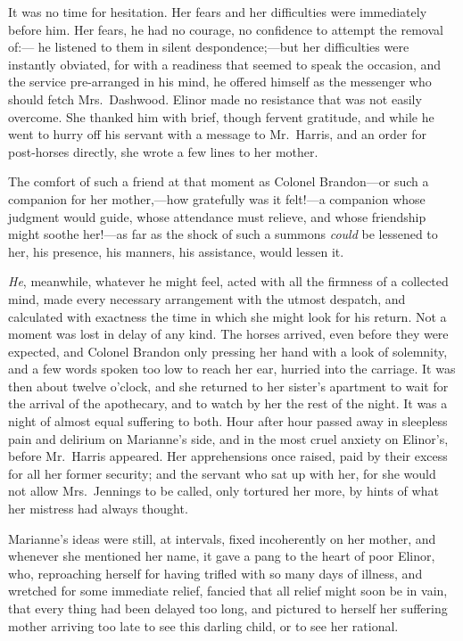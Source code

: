 \documentclass{article}
\begin{document}
It was no time for hesitation.  Her fears and her
difficulties were immediately before him.  Her fears,
he had no courage, no confidence to attempt the removal of:---%
he listened to them in silent despondence;---but her
difficulties were instantly obviated, for with a readiness
that seemed to speak the occasion, and the service
pre-arranged in his mind, he offered himself as the
messenger who should fetch Mrs.\ Dashwood.  Elinor made no
resistance that was not easily overcome.  She thanked him
with brief, though fervent gratitude, and while he went
to hurry off his servant with a message to Mr.\ Harris, and
an order for post-horses directly, she wrote a few lines
to her mother.

The comfort of such a friend at that moment as Colonel
Brandon---or such a companion for her mother,---how gratefully
was it felt!---a companion whose judgment would guide,
whose attendance must relieve, and whose friendship might
soothe her!---as far as the shock of such a summons \emph{could}
be lessened to her, his presence, his manners, his assistance,
would lessen it.

\emph{He}, meanwhile, whatever he might feel, acted with all
the firmness of a collected mind, made every necessary
arrangement with the utmost despatch, and calculated
with exactness the time in which she might look for
his return.  Not a moment was lost in delay of any kind.
The horses arrived, even before they were expected,
and Colonel Brandon only pressing her hand with a look
of solemnity, and a few words spoken too low to reach her ear,
hurried into the carriage.  It was then about twelve
o'clock, and she returned to her sister's apartment to wait
for the arrival of the apothecary, and to watch by her
the rest of the night.  It was a night of almost equal
suffering to both.  Hour after hour passed away in sleepless
pain and delirium on Marianne's side, and in the most
cruel anxiety on Elinor's, before Mr.\ Harris appeared.
Her apprehensions once raised, paid by their excess for all
her former security; and the servant who sat up with her,
for she would not allow Mrs.\ Jennings to be called,
only tortured her more, by hints of what her mistress
had always thought.

Marianne's ideas were still, at intervals,
fixed incoherently on her mother, and whenever she
mentioned her name, it gave a pang to the heart of
poor Elinor, who, reproaching herself for having trifled
with so many days of illness, and wretched for some
immediate relief, fancied that all relief might soon
be in vain, that every thing had been delayed too long,
and pictured to herself her suffering mother arriving
too late to see this darling child, or to see her rational.
\end{document}
